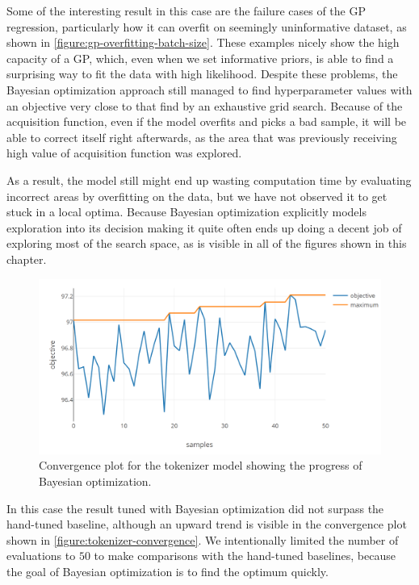 Some of the interesting result in this case are the failure cases of the GP regression, particularly how it can overfit on seemingly uninformative dataset, as shown in \autoref{figure:gp-overfitting-batch-size}. These examples nicely show the high capacity of a GP, which, even when we set informative priors, is able to find a surprising way to fit the data with high likelihood. Despite these problems, the Bayesian optimization approach still managed to find hyperparameter values with an objective very close to that find by an exhaustive grid search. Because of the acquisition function, even if the model overfits and picks a bad sample, it will be able to correct itself right afterwards, as the area that was previously receiving high value of acquisition function was explored.

As a result, the model still might end up wasting computation time by evaluating incorrect areas by overfitting on the data, but we have not observed it to get stuck in a local optima. Because Bayesian optimization explicitly models exploration into its decision making it quite often ends up doing a decent job of exploring most of the search space, as is visible in all of the figures shown in this chapter.

\begin{figure}
	\begin{center}
		\includegraphics[width=1.0\textwidth]{images/tokenizer-convergence.png}
		\caption{Convergence plot for the tokenizer model showing the progress of Bayesian optimization.}
		\label{figure:tokenizer-convergence}
	\end{center}
\end{figure}

In this case the result tuned with Bayesian optimization did not surpass the hand-tuned baseline, although an upward trend is visible in the convergence plot shown in \autoref{figure:tokenizer-convergence}. We intentionally limited the number of evaluations to $50$ to make comparisons with the hand-tuned baselines, because the goal of Bayesian optimization is to find the optimum quickly.

